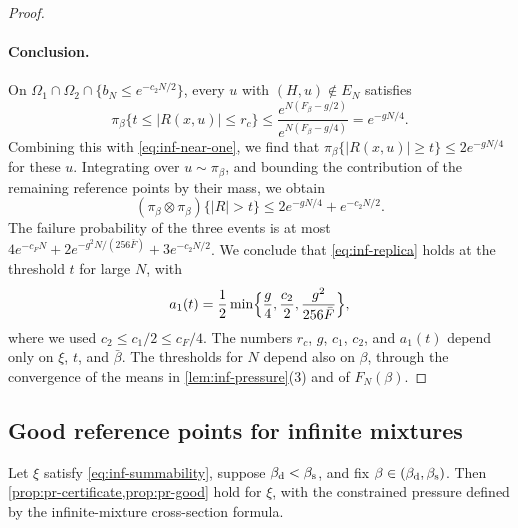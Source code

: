 \begin{proof}
\paragraph{Conclusion.} On $\Omega_1\cap\Omega_2\cap\{b_N\le e^{-c_2N/2}\}$, every $u$ with $(H,u)\notin E_N$ satisfies
\begin{equation*}
\pi_\beta\{t\le|R(x,u)|\le r_c\}\le\frac{e^{N(F_\beta-g/2)}}{e^{N(F_\beta-g/4)}}=e^{-gN/4}.
\end{equation*}
Combining this with \eqref{eq:inf-near-one}, we find that $\pi_\beta\{|R(x,u)|\ge t\}\le2e^{-gN/4}$ for these $u$. Integrating over $u\sim\pi_\beta$, and bounding the contribution of the remaining reference points by their mass, we obtain
\begin{equation*}
(\pi_\beta\otimes\pi_\beta)\{|R|>t\}\le2e^{-gN/4}+e^{-c_2N/2}.
\end{equation*}
The failure probability of the three events is at most $4e^{-c_FN}+2e^{-g^2N/(256\bar F)}+3e^{-c_2N/2}$. We conclude that \eqref{eq:inf-replica} holds at the threshold $t$ for large $N$, with
\begin{equation*}
a_1(t)=\frac12\min\Bigl\{\frac g4,\frac{c_2}2,\frac{g^2}{256\bar F}\Bigr\},
\end{equation*}
where we used $c_2\le c_1/2\le c_F/4$. The numbers $r_c$, $g$, $c_1$, $c_2$, and $a_1(t)$ depend only on $\xi$, $t$, and $\bar\beta$. The thresholds for $N$ depend also on $\beta$, through the convergence of the means in \cref{lem:inf-pressure}(3) and of $F_N(\beta)$.
\end{proof}

\subsection{Good reference points for infinite mixtures}\label{sec:inf-good}

\begin{lemma}\label{lem:inf-good}
Let $\xi$ satisfy \eqref{eq:inf-summability}, suppose $\beta_{\mathrm d}<\beta_{\mathrm s}$, and fix $\beta\in(\beta_{\mathrm d},\beta_{\mathrm s})$. Then \cref{prop:pr-certificate,prop:pr-good} hold for $\xi$, with the constrained pressure defined by the infinite-mixture cross-section formula.
\end{lemma}


